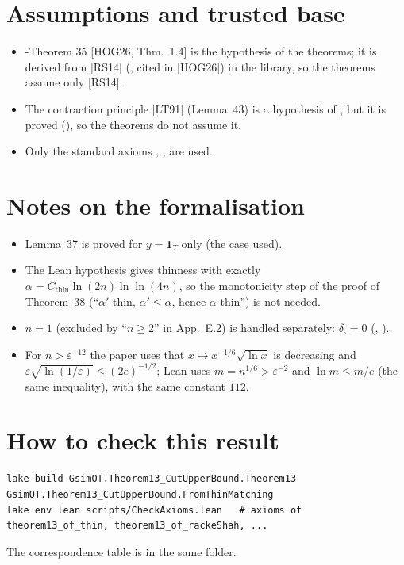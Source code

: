 \section{Assumptions and trusted base}
\begin{itemize}
\item \hyp{Theorem 35} [HOG26, Thm.~1.4] is the hypothesis  of the  theorems; it is
derived from [RS14] (, cited in [HOG26]) in the  library, so the
 theorems assume only [RS14].
\item The contraction principle [LT91] (Lemma~43) is a hypothesis of , but it is proved
(), so the  theorems do not assume it.
\item Only the standard axioms , ,  are used.
\end{itemize}

\section{Notes on the formalisation}
\begin{itemize}
\item Lemma~37 is proved for $y=\mathbf1_T$ only (the case used).
\item The Lean hypothesis gives thinness with exactly $\alpha=C_{\mathrm{thin}}\ln(2n)\ln\ln(4n)$, so the monotonicity step of the
proof of Theorem~38 (``$\alpha'$-thin, $\alpha'\le\alpha$, hence $\alpha$-thin'') is not needed.
\item $n=1$ (excluded by ``$n\ge2$'' in App.~E.2) is handled separately: $\delta_\square=0$
(, ).
\item For $n>\varepsilon^{-12}$ the paper uses that $x\mapsto x^{-1/6}\sqrt{\ln x}$ is decreasing and
$\varepsilon\sqrt{\ln(1/\varepsilon)}\le(2e)^{-1/2}$; Lean uses $m=n^{1/6}>\varepsilon^{-2}$ and $\ln m\le m/e$ (the same
inequality), with the same constant $112$.
\end{itemize}

\section{How to check this result}
\begin{verbatim}
lake build GsimOT.Theorem13_CutUpperBound.Theorem13 GsimOT.Theorem13_CutUpperBound.FromThinMatching
lake env lean scripts/CheckAxioms.lean   # axioms of theorem13_of_thin, theorem13_of_rackeShah, ...
\end{verbatim}
The correspondence table is  in the same folder.

